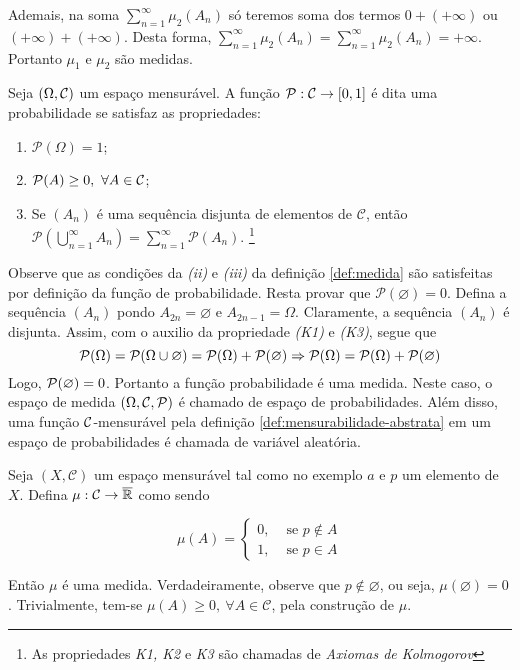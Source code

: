 Ademais, na soma $\displaystyle \sum_{n = 1}^\infty \mu_2(A_n)$ só teremos soma dos termos $0 + (+ \infty)$ ou $(+\infty) + (+\infty)$.
Desta forma, $\displaystyle \sum_{n = 1}^\infty \mu_2(A_n) = \sum_{n = 1}^\infty \mu_2(A_n) = +\infty$.
Portanto $\mu_1$ e $\mu_2$ são medidas.

\begin{example}[Probabilidade]
	Seja $(\Omega, \operatorname{\mathcal{C}})$ um espaço mensurável.
	A função $\mathcal{P}:\operatorname{\mathcal{C}} \to [0,1]$ é dita uma probabilidade se satisfaz as propriedades:
	\begin{enumerate}[label* =(K\arabic*)]
		\item $\mathcal{P}(\Omega) = 1$;
		\item $\mathcal{P}(A) \geq 0,\ \forall A \in \operatorname{\mathcal{C}}$;
		\item Se $(A_n)$ é uma sequência disjunta de elementos de  $\mathcal{C}$, então 
		$\displaystyle\mathcal{P}\left(\bigcup_{n = 1}^\infty A_n\right) = \sum_{n = 1}^\infty\mathcal{P}(A_n)$.
		\footnote{As propriedades \textit{K1, K2} e \textit{K3} são chamadas de \textit{Axiomas de Kolmogorov}}
	\end{enumerate}
\end{example}

Observe que as condições da \textit{(ii)} e \textit{(iii)} da definição \ref{def:medida} são satisfeitas por definição da função de probabilidade.
Resta provar que $\mathcal{P}(\varnothing) = 0$.
Defina a sequência $(A_n)$ pondo $A_{2n} = \varnothing$ e $A_{2n-1} = \Omega$.
Claramente, a sequência $(A_n)$ é disjunta.
Assim, com o auxilio da propriedade \textit{(K1)} e \textit{(K3)}, segue que 
$$
\operatorname{\mathcal{P}}(\Omega)
= 
\operatorname{\mathcal{P}}(\Omega \cup \varnothing)
= 
\operatorname{\mathcal{P}}(\Omega) + \operatorname{\mathcal{P}}(\varnothing)
\Rightarrow
\operatorname{\mathcal{P}}(\Omega)
= 
\operatorname{\mathcal{P}}(\Omega) + \operatorname{\mathcal{P}}(\varnothing)
$$
Logo, $\operatorname{\mathcal{P}}(\varnothing) = 0$. 
Portanto a função probabilidade é uma medida.
Neste caso, o espaço de medida $(\Omega, \operatorname{\mathcal{C}}, \operatorname{\mathcal{P}})$ é chamado de espaço de probabilidades.
Além disso, uma função $\operatorname{\mathcal{C}}$-mensurável pela definição \ref{def:mensurabilidade-abstrata} em um espaço de probabilidades é chamada de variável aleatória.

\begin{example}
\label{ex:medida-concentrada-em-p}
    Seja $(X, \mathcal{C})$ um espaço mensurável tal como no exemplo $a$ e $p$ um elemento de $X$.
    Defina $\mu: \mathcal{C} \to \operatorname{\overline{\mathbb{R}}}$  como sendo


$$\mu(A) = \left\{\begin{array}{cc}
0, & \textrm{\ se \ } p \notin A \\
1, & \textrm{\ se \ } p \in A 
\end{array}\right.$$


Então $\mu$ é uma medida.
Verdadeiramente, observe que $p \notin \varnothing$, ou seja, $\mu(\varnothing) = 0$.
Trivialmente, tem-se $\mu(A) \geq 0,\ \forall A \in \mathcal{C}$, pela construção de $\mu$.



\end{example}

